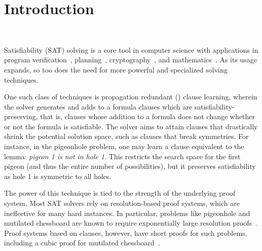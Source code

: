 \section{Introduction}~\label{sec:intro}


Satisfiability (SAT) solving is a core tool in computer science with applications in program verification~\cite{BillionQueries,sat-hardwareverification,ic3,bmc}, planning~\cite{planning,planningassat}, cryptography~\cite{cryptominisat}, and mathematics~\cite{chromaticnumber,pythagoreantriples,kellersconjecture,emptyhexagon}. As its usage expands, so too does the need for more powerful and specialized solving techniques.



One such class of techniques is propagation redundant (\pr) clause learning, wherein the solver generates and adds to a formula clauses which are satisfiability-preserving, that is, clauses whose addition to a formula does not change whether or not the formula is satisfiable. The solver aims to attain clauses that drastically shrink the potential solution space, such as clauses that break symmetries. For instance, in the pigeonhole problem, one may learn a clause equivalent to the lemma: \emph{pigeon 1 is not in hole 1}. This restricts the search space for the first pigeon (and thus the entire number of possibilities), but it preserves satisfiability as hole 1 is symmetric to all holes.



The power of this technique is tied to the strength of the underlying proof system. Most SAT solvers rely on resolution-based proof systems, which are ineffective for many hard instances. In particular, problems like pigeonhole and mutilated chessboard are known to require exponentially large resolution proofs~\cite{hakenpigeonhole,mutilatedchessboard-exponential}. Proof systems based on \pr clauses, however, have short proofs for such problems, including a cubic proof for mutilated chessboard~\cite{mutilatedchessboard-pr}.

